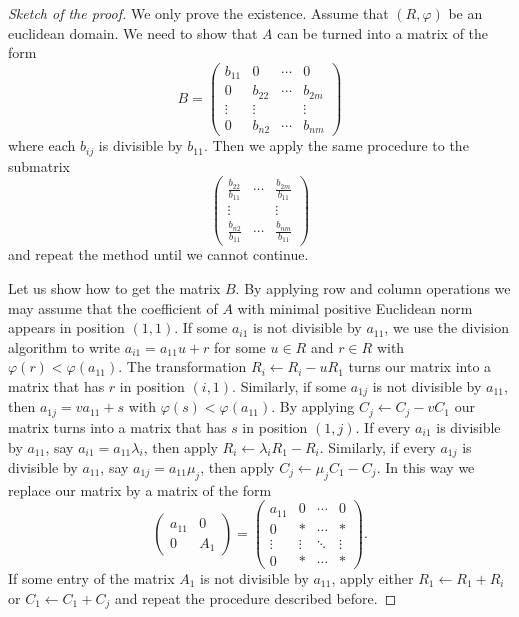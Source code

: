 \begin{proof}[Sketch of the proof]
	We only prove the existence. Assume that $(R,\varphi)$ be an euclidean domain.  
	We need to show that $A$ can be turned into a matrix of the form 
\begin{equation*}
B=\begin{pmatrix}
	b_{11} & 0 & \cdots & 0\\
	0 & b_{22} & \cdots & b_{2m}\\
	\vdots & \vdots &&  \vdots\\
	0 & b_{n2} & \cdots & b_{nm}
\end{pmatrix}
\end{equation*}
where each  $b_{ij}$ is divisible by $b_{11}$. Then we apply the same procedure
to the submatrix 
\[
\begin{pmatrix}
	\frac{b_{22}}{b_{11}} & \cdots & \frac{b_{2m}}{b_{11}}\\
	\vdots & &\vdots \\
	\frac{b_{n2}}{b_{11}} & \cdots & \frac{b_{nm}}{b_{11}}
\end{pmatrix}
\]
and repeat the method until we cannot continue. 

Let us show how to get the matrix $B$. 
By applying row and column operations we may assume that the coefficient of $A$ 
with minimal positive Euclidean norm appears in position
$(1,1)$.  
If some $a_{i1}$ is not divisible by $a_{11}$, we use the division algorithm to write   
$a_{i1}=a_{11}u+r$ for some $u\in R$ and $r\in R$ with 
$\varphi(r)<\varphi(a_{11})$. The transformation 
$R_i\leftarrow R_i-uR_1$ turns our matrix into a matrix that 
has $r$ in position $(i,1)$. Similarly, if some $a_{1j}$
is not divisible by $a_{11}$, then $a_{1j}=va_{11}+s$ with $\varphi(s)<\varphi(a_{11})$. 
By applying  
$C_j\leftarrow C_j-vC_1$ our matrix turns into a matrix 
that has $s$ in position 
$(1,j)$.  
If every $a_{i1}$ is divisible by $a_{11}$, say $a_{i1}=a_{11}\lambda_i$, then
apply $R_i\leftarrow \lambda_i R_1-R_i$. Similarly, if 
every $a_{1j}$ is divisible by $a_{11}$, say $a_{1j}=a_{11}\mu_j$, then
apply $C_j\leftarrow \mu_j C_1-C_j$. In this way we replace our matrix by 
a matrix of the form 
\[
\begin{pmatrix}
	a_{11} & 0\\
	0 & A_1
\end{pmatrix}
=\begin{pmatrix}
	a_{11} & 0 & \cdots & 0\\
	0 & * & \cdots & *\\
	\vdots & \vdots & \ddots & \vdots \\
	0 & * & \cdots & *
\end{pmatrix}.
\]
If some entry of the matrix $A_1$ is not divisible by $a_{11}$, apply either 
$R_1\leftarrow R_1+R_i$ or $C_1\leftarrow C_1+C_j$ and repeat 
the procedure described before. 
\end{proof}

